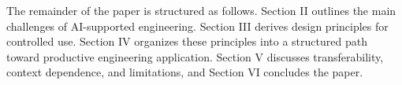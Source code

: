 The remainder of the paper is structured as follows. Section II outlines the main challenges
of AI-supported engineering. Section III derives design principles for controlled use.
Section IV organizes these principles into a structured path toward productive engineering
application. Section V discusses transferability, context dependence, and limitations, and
Section VI concludes the paper.
